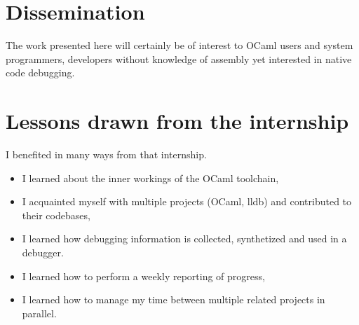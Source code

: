 \section{Dissemination\label{sec:dissemination}}

The work presented here will certainly be of interest to OCaml users and system
programmers, developers without knowledge of assembly yet interested in native
code debugging.











\section{Lessons drawn from the internship}

I benefited in many ways from that internship.\\
\begin{itemize}
    \item I learned about the inner workings of the OCaml toolchain,
    \item I acquainted myself with multiple projects (OCaml, lldb) and contributed to their codebases,
    \item I learned how debugging information is collected, synthetized and used
        in a debugger.
    \item I learned how to perform a weekly reporting of progress,
    \item I learned how to manage my time between multiple related projects in
        parallel.
\end{itemize}
